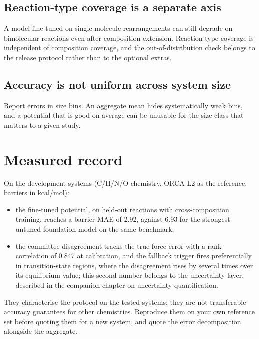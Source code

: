 \subsection{Reaction-type coverage is a separate axis}
A model fine-tuned on single-molecule rearrangements can still degrade on
bimolecular reactions even after composition extension.  Reaction-type
coverage is independent of composition coverage, and the out-of-distribution
check belongs to the release protocol rather than to the optional extras.

\subsection{Accuracy is not uniform across system size}
Report errors in size bins.  An aggregate mean hides systematically weak bins,
and a potential that is good on average can be unusable for the size class
that matters to a given study.

\section{Measured record}
\label{sec:al-record}

On the development systems (C/H/N/O chemistry, ORCA L2 as the reference,
barriers in kcal/mol):

\begin{itemize}
  \item the fine-tuned potential, on held-out reactions with
        cross-composition training, reaches a barrier MAE of 2.92, against
        6.93 for the strongest untuned foundation model on the same benchmark;
  \item the committee disagreement tracks the true force error with a rank
        correlation of 0.847 at calibration, and the fallback trigger fires
        preferentially in transition-state regions, where the disagreement
        rises by several times over its equilibrium value; this second number
        belongs to the uncertainty layer, described in the companion chapter
        on uncertainty quantification.
\end{itemize}

\begin{readbox}
They characterise the protocol on the tested systems; they are not
transferable accuracy guarantees for other chemistries.  Reproduce them on
your own reference set before quoting them for a new system, and quote the
error decomposition alongside the aggregate.
\end{readbox}

